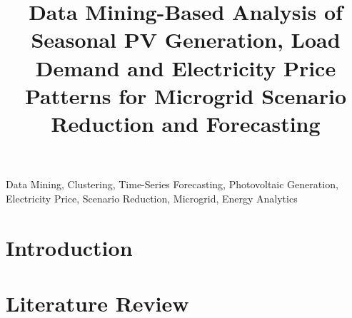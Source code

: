 \documentclass[conference]{IEEEtran}
\begin{document}
\title{Data Mining-Based Analysis of Seasonal PV Generation, Load Demand and Electricity Price Patterns for Microgrid Scenario Reduction and Forecasting}

\author{
}

\maketitle

\begin{abstract}
\end{abstract}

\begin{IEEEkeywords}
Data Mining, Clustering, Time-Series Forecasting, Photovoltaic Generation, Electricity Price, Scenario Reduction, Microgrid, Energy Analytics
\end{IEEEkeywords}

\section{Introduction}

\section{Literature Review}
\end{document}
